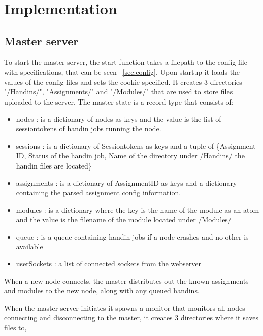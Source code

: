 \section{Implementation}
\subsection{Master server}
To start the master server, the start function takes a filepath to the config file with specifications, that can be seen ~\ref{sec:config}. Upon startup it loads the values of the config files and sets the cookie specified. It creates 3 directories "/Handins/", "Assignments/" and "/Modules/" that are used to store files uploaded to the server. The master state is a record type that consists of:
\begin{itemize}
\item nodes : is a dictionary of nodes as keys and the value is the list of sessiontokens of handin jobs running the node.
\item sessions : is a dictionary of Sessiontokens as keys and a tuple of \{Assignment ID, Status of the handin job, Name of the directory under /Handins/ the handin files are located\}
\item assignments : is a dictionary of AssignmentID as keys and a dictionary containing the parsed assignment config information.
\item modules : is a dictionary where the key is the name of the module as an atom and the value is the filename of the module located under /Modules/
\item queue : is a queue containing handin jobs if a node crashes and no other is available
\item userSockets : a list of connected sockets from the webserver
\end{itemize}

When a new node connects, the master distributes out the known assignments and modules to the new node, along with any queued handins.









When the master server initiates it spawns a monitor that monitors all nodes connecting and disconnecting to the master, it creates 3 directories where it saves files to,












